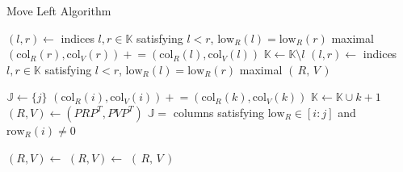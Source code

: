 \documentclass{article} %
\begin{document}
\begin{algorithm}[!htb]
	\caption{Move Left Algorithm}\label{alg:ml}
    \begin{algorithmic}[1]
            \State $(l, r) \gets $ indices $l, r \in \mathbb{K}$ satisfying $l < r$, $\mathrm{low}_R(l) = \mathrm{low}_R(r)$ maximal 
            	\State $(\mathrm{col}_R(r), \mathrm{col}_V(r)) \mathrel{+}= (\mathrm{col}_R(l), \mathrm{col}_V(l))$
            	\State $\mathbb{K} \gets \mathbb{K} \setminus l$
            	\State $(l, r) \gets $ indices $l, r \in \mathbb{K}$ satisfying $l < r$, $\mathrm{low}_R(l) = \mathrm{low}_R(r)$ maximal
            \EndWhile
        	\State \Return $(\, R, \, V \, )$
        \EndFunction
    \end{algorithmic}
    
    \begin{algorithmic}[1]
        	\State $\mathbb{J} \gets \{ j \}$
            	\State $(\mathrm{col}_R(i), \mathrm{col}_V(i)) \mathrel{+}= (\mathrm{col}_R(k), \mathrm{col}_V(k))$
            	\State $\mathbb{K} \gets \mathbb{K} \cup k + 1 $
            \EndWhile
            \State $(R, V) \gets (P R P^T, P V P^T)$
            \State $\mathbb{J} = $ columns satisfying $\mathrm{low}_R \in [i:j]$ and $\mathrm{row}_R(i) \neq 0$ %

            \State $(R, V) \gets$ 
            \State $(R, V) \gets$ 
			\State \Return $(\, R, \, V\,)$
        \EndFunction
    \end{algorithmic}

\end{algorithm}
\end{document}
